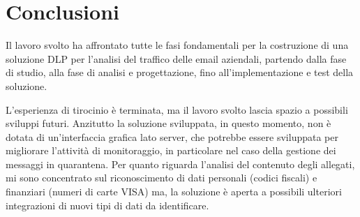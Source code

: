 \chapter{Conclusioni}

Il lavoro svolto ha affrontato tutte le fasi fondamentali per la costruzione di una 
soluzione DLP per l'analisi del traffico delle email aziendali, partendo dalla fase di 
studio, alla fase di analisi e progettazione, fino all'implementazione e test della soluzione.

L'esperienza di tirocinio è terminata, ma il lavoro svolto lascia spazio a possibili sviluppi futuri.
Anzitutto la soluzione sviluppata, in questo momento, non è dotata di un'interfaccia grafica lato server,
che potrebbe essere sviluppata per migliorare l'attività di monitoraggio, in particolare nel caso della 
gestione dei messaggi in quarantena.
Per quanto riguarda l'analisi del contenuto degli allegati, mi sono concentrato sul riconoscimento di dati personali 
(codici fiscali) e finanziari (numeri di carte VISA) ma, la soluzione è aperta a possibili ulteriori integrazioni di nuovi
tipi di dati da identificare. 
